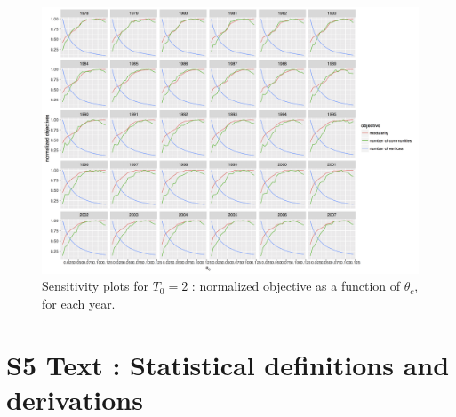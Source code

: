 \documentclass[12pt,twoside,a4paper]{article}
\begin{document}
\begin{figure}
\centering
\includegraphics[width=\textheight,height=\textwidth,angle=90]{normalizedObjs-dispth_window3_eth4_1e-5.png}
\caption{Sensitivity plots for $T_0 = 2$ : normalized objective as a function of $\theta_c$, for each year.}
\label{fig:sensitivity-window3-3}
\end{figure}








\newpage




\section*{S5 Text : Statistical definitions and derivations}
\end{document}
